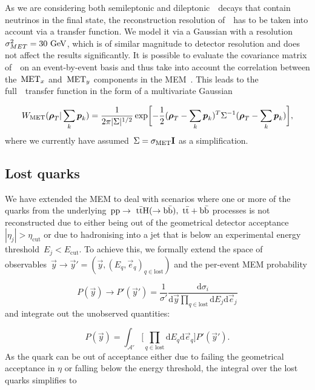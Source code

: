As we are considering both semileptonic and dileptonic~\ttH~decays that contain neutrinos in the final state, the reconstruction resolution of~\MET~has to be taken into account via a transfer function. We model it via a Gaussian with a resolution~$\sigma_{MET}^2 = 30~\mathrm{GeV}$, which is of similar magnitude to detector resolution and does not affect the results significantly.
It is possible to evaluate the covariance matrix of~\MET~on an event-by-event basis and thus take into account the correlation between the~$\mathrm{MET}_x$ and~$\mathrm{MET}_y$ components in the MEM~\cite{2011JInst...6.9001C}. This leads to the full~\MET~transfer function in the form of a  multivariate Gaussian

\begin{equation}
W_{\mathrm{MET}}(\boldsymbol{\rho}_T | \sum_k \boldsymbol{p}_k) = \frac{1}{2\pi |\Sigma|^{1/2}} \exp \biggl[ -\frac{1}{2} (\boldsymbol{\rho}_T - \sum_k \boldsymbol{p}_k)^T \Sigma^{-1} (\boldsymbol{\rho}_T - \sum_k \boldsymbol{p}_k)\biggr],
\end{equation}
where we currently have assumed~$\Sigma = \sigma_{\mathrm{MET}} \mathbf{I}$ as a simplification.

\subsection{Lost quarks}
\label{sec:lost_quarks}
We have extended the MEM to deal with scenarios where one or more of the quarks from the underlying~$\mathrm{pp} \rightarrow~\mathrm{t} \bar{\mathrm{t}} \mathrm{H}(\rightarrow \mathrm{b}\bar{\mathrm{b}}),\ \mathrm{t} \bar{\mathrm{t}} + \mathrm{b}\bar{\mathrm{b}}$ processes is not reconstructed due to either being out of the geometrical detector acceptance~$|\eta_j| > \eta_{\mathrm{cut}}$ or due to hadronising into a jet that is below an experimental energy threshold~$E_j < E_{\mathrm{cut}}$.
To achieve this, we formally extend the space of observables~$\vec{y} \rightarrow \vec{y}' = (\vec{y}, (E_q, \vec{e}_q)_{q \in \mathrm{lost}})$ and the per-event MEM probability

\begin{equation}
P(\vec{y}) \rightarrow P'(\vec{y}') = \frac{1}{\sigma'} \frac{\mathrm{d} \sigma_i}{\mathrm{d}\vec{y} \prod_{q\in\mathrm{lost}} \mathrm{d}E_j \mathrm{d}\vec{e}_j}
\end{equation}
and integrate out the unobserved quantities:

\begin{equation}
P(\vec{y}) = \int_{\mathcal{A}'} \bigl[ \prod_{q \in \mathrm{lost}} \mathrm{d}E_q \mathrm{d}\vec{e}_q \bigr] P'(\vec{y}').
\end{equation}
As the quark can be out of acceptance either due to failing the geometrical acceptance in $\eta$ or falling below the energy threshold, the integral over the lost quarks simplifies to

